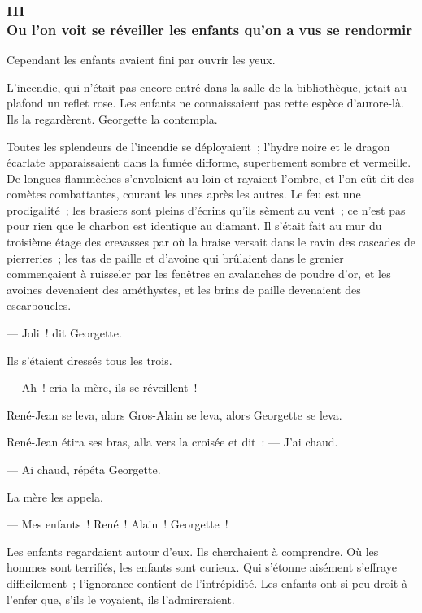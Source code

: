 \documentclass[french,twoside]{book} %
\begin{document}
 \subsubsection[{III. Ou l’on voit se réveiller les enfants qu’on a vus se rendormir}]{III \\
Ou l’on voit se réveiller les enfants qu’on a vus se rendormir}
\label{p3l5c3}
\noindent Cependant les enfants avaient fini par ouvrir les yeux.\par
L’incendie, qui n’était pas encore entré dans la salle de la bibliothèque, jetait au plafond un reflet rose. Les enfants ne connaissaient pas cette espèce d’aurore-là. Ils la regardèrent. Georgette la contempla.\par
Toutes les splendeurs de l’incendie se déployaient ; l’hydre noire et le dragon écarlate apparaissaient dans la fumée difforme, superbement sombre et vermeille. De longues flammèches s’envolaient au loin et rayaient l’ombre, et l’on eût dit des comètes combattantes, courant les unes après les autres. Le feu est une prodigalité ; les brasiers sont pleins d’écrins qu’ils sèment au vent ; ce n’est pas pour rien que le charbon est identique au diamant. Il s’était fait au mur du troisième étage des crevasses par où la braise versait dans le ravin des cascades de pierreries ; les tas de paille et d’avoine qui brûlaient dans le grenier commençaient à ruisseler par les fenêtres en avalanches  de poudre d’or, et les avoines devenaient des améthystes, et les brins de paille devenaient des escarboucles.\par
— Joli ! dit Georgette.\par
Ils s’étaient dressés tous les trois.\par
— Ah ! cria la mère, ils se réveillent !\par
René-Jean se leva, alors Gros-Alain se leva, alors Georgette se leva.\par
René-Jean étira ses bras, alla vers la croisée et dit : — J’ai chaud.\par
— Ai chaud, répéta Georgette.\par
La mère les appela.\par
— Mes enfants ! René ! Alain ! Georgette !\par
Les enfants regardaient autour d’eux. Ils cherchaient à comprendre. Où les hommes sont terrifiés, les enfants sont curieux. Qui s’étonne aisément s’effraye difficilement ; l’ignorance contient de l’intrépidité. Les enfants ont si peu droit à l’enfer que, s’ils le voyaient, ils l’admireraient.\par
\end{document}
